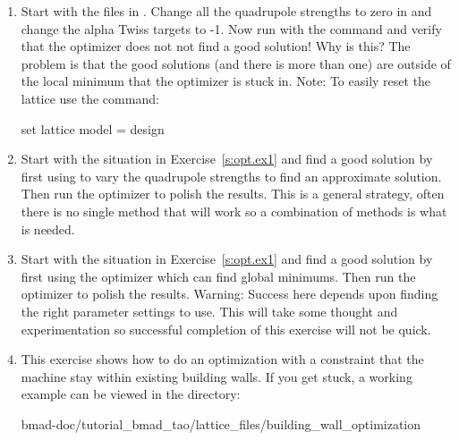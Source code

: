 \documentclass{hitec}     %
\begin{document}
{\begin{enumerate}[label=\thesection.\arabic{enumi}]
\item
\label{s:opt.ex1}
Start with the files in . Change
all the quadrupole strengths to zero in  and change the alpha Twiss  targets
to -1. Now run with the  command and verify that the optimizer does not not find a good
solution! Why is this? The problem is that the good solutions (and there is more than one) are
outside of the local minimum that the optimizer is stuck in. 
Note: To easily reset the lattice use the command:
\begin{code}
set lattice model = design
\end{code}
%
\item
Start with the situation in Exercise~\ref{s:opt.ex1} and find a good solution by first using
 to vary the quadrupole strengths to find an approximate solution. Then run the
 optimizer to polish the results. This is a general strategy, often there is no single method
that will work so a combination of methods is what is needed.
%
\item
Start with the situation in Exercise~\ref{s:opt.ex1} and find a good solution by first using the
 optimizer which can find global minimums. Then run the  optimizer to polish the
results. Warning: Success here depends upon finding the right  parameter settings to
use. This will take some thought and experimentation so successful completion of this exercise will
not be quick.
%
\item
This exercise shows how to do an optimization with a constraint that the machine stay within
existing building walls. If you get stuck, a working example can be viewed in the
directory:
\begin{code}
bmad-doc/tutorial_bmad_tao/lattice_files/building_wall_optimization
\end{code}


\end{enumerate}}
\end{document}
